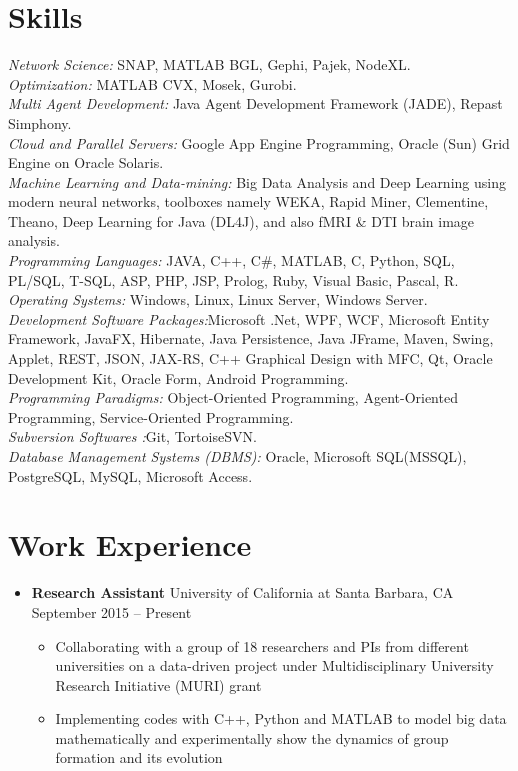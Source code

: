 \documentclass[letter]{res}
\begin{document}
\begin{resume}
\section{Skills}
{\sl Network Science: }SNAP, MATLAB BGL, Gephi, Pajek, NodeXL.\\
{\sl Optimization: }MATLAB CVX, Mosek, Gurobi.\\
{\sl Multi Agent Development: }Java Agent Development Framework (JADE), Repast Simphony.\\
{\sl Cloud and Parallel Servers: }Google App Engine Programming, Oracle (Sun) Grid Engine on Oracle Solaris.\\
{\sl Machine Learning and Data-mining: }Big Data Analysis and Deep Learning using modern neural networks, toolboxes namely WEKA, Rapid Miner, Clementine, Theano, Deep Learning for Java (DL4J), and also fMRI \& DTI brain image analysis.\\
\textit{Programming Languages: }JAVA, C++, C\#, MATLAB, C, Python, SQL, PL/SQL, T-SQL, ASP, PHP, JSP, Prolog, Ruby, Visual Basic, Pascal, R.\\
\textit{Operating Systems: } Windows, Linux, Linux Server, Windows Server.\\
\textit{Development Software Packages:}Microsoft .Net, WPF, WCF, Microsoft Entity Framework, JavaFX, Hibernate, Java Persistence, Java JFrame, Maven, Swing, Applet, REST, JSON, JAX-RS, C++ Graphical Design with MFC, Qt, Oracle Development Kit, Oracle Form, Android Programming.\\
\textit{Programming Paradigms: }Object-Oriented Programming, Agent-Oriented Programming, Service-Oriented Programming.\\
\textit{Subversion Softwares :}Git, TortoiseSVN.\\
\textit{Database Management Systems (DBMS): }Oracle, Microsoft SQL(MSSQL), PostgreSQL, MySQL, Microsoft Access.

\section{Work Experience}
\begin{itemize}[leftmargin=-.1in]
\item \textbf{Research Assistant} \newline
University of California at Santa Barbara, CA \hfill September 2015 – Present\\
   \vspace{-4mm}
   \iflong
     \begin{itemize}
     \item Collaborating with a group of 18 researchers and PIs from different universities on a data-driven project under Multidisciplinary University Research Initiative (MURI) grant
     \item Implementing codes with C++, Python and MATLAB to model big data mathematically and experimentally show the dynamics of group formation and its evolution
     \end{itemize}
   \fi
   

\end{itemize}
\end{resume}
\end{document}

